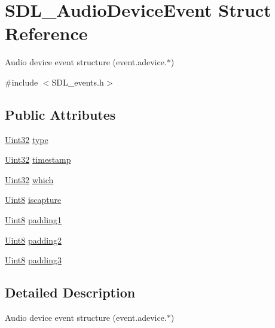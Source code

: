 \hypertarget{struct_s_d_l___audio_device_event}{}\section{S\+D\+L\+\_\+\+Audio\+Device\+Event Struct Reference}
\label{struct_s_d_l___audio_device_event}


Audio device event structure (event.\+adevice.$\ast$)  




{\ttfamily \#include $<$S\+D\+L\+\_\+events.\+h$>$}

\subsection*{Public Attributes}
\begin{DoxyCompactItemize}
\item 
\hyperlink{_s_d_l__stdinc_8h_add440eff171ea5f55cb00c4a9ab8672d}{Uint32} \hyperlink{struct_s_d_l___audio_device_event_ae68c3bd49b49608711a17395c7cbfe58}{type}
\item 
\hyperlink{_s_d_l__stdinc_8h_add440eff171ea5f55cb00c4a9ab8672d}{Uint32} \hyperlink{struct_s_d_l___audio_device_event_aa471680486a6103eafc9af569016df57}{timestamp}
\item 
\hyperlink{_s_d_l__stdinc_8h_add440eff171ea5f55cb00c4a9ab8672d}{Uint32} \hyperlink{struct_s_d_l___audio_device_event_ac91d70fd4e1dd596185fed061388896c}{which}
\item 
\hyperlink{_s_d_l__stdinc_8h_a2944638813a090aa23e62f4da842c3e2}{Uint8} \hyperlink{struct_s_d_l___audio_device_event_a1482dcd50b47046ef8e9bfa7cc7457d9}{iscapture}
\item 
\hyperlink{_s_d_l__stdinc_8h_a2944638813a090aa23e62f4da842c3e2}{Uint8} \hyperlink{struct_s_d_l___audio_device_event_ad6efdec7189e735f4a05fc123c0cb723}{padding1}
\item 
\hyperlink{_s_d_l__stdinc_8h_a2944638813a090aa23e62f4da842c3e2}{Uint8} \hyperlink{struct_s_d_l___audio_device_event_adf9bebd56d707860045d31359535a2a4}{padding2}
\item 
\hyperlink{_s_d_l__stdinc_8h_a2944638813a090aa23e62f4da842c3e2}{Uint8} \hyperlink{struct_s_d_l___audio_device_event_af3163ba92c77f08a4f0d8f043f24c96c}{padding3}
\end{DoxyCompactItemize}


\subsection{Detailed Description}
Audio device event structure (event.\+adevice.$\ast$) 

